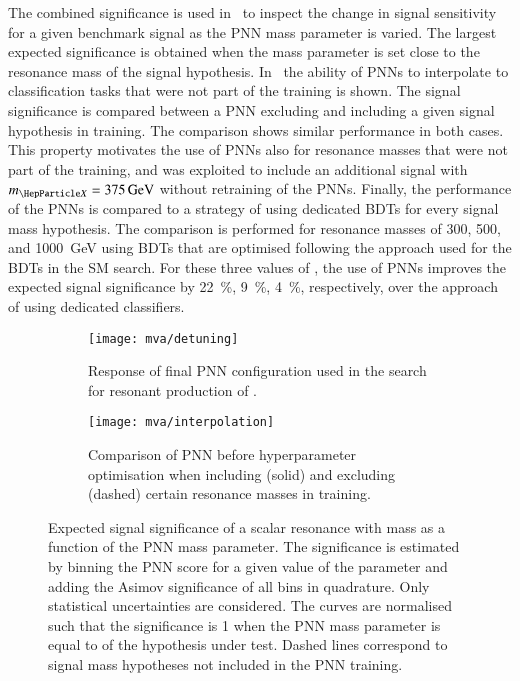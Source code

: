The combined significance is used in~ to
inspect the change in signal sensitivity for a given benchmark signal
as the PNN mass parameter is varied. The largest expected significance
is obtained when the mass parameter is set close to the resonance mass
of the signal hypothesis.
In~ the ability of PNNs to interpolate to
classification tasks that were not part of the training is shown. The
signal significance is compared between a PNN excluding and including
a given signal hypothesis in training. The comparison shows similar
performance in both cases. This property motivates the use of PNNs
also for resonance masses that were not part of the training, and was
exploited to include an additional signal with $\mX = \SI{375}{\GeV}$
without retraining of the PNNs. %
Finally, the performance of the PNNs is compared to a strategy of
using dedicated BDTs for every signal mass hypothesis. The comparison
is performed for resonance masses of \num{300}, \num{500}, and
\SI{1000}{\GeV} using BDTs that are optimised following the approach
used for the BDTs in the SM \HH search. For these three values of \mX,
the use of PNNs improves the expected signal significance by
\SI{22}{\percent}, \SI{9}{\percent}, \SI{4}{\percent}, respectively,
over the approach of using dedicated classifiers.

\begin{figure}[htbp]
  \centering

  \begin{subfigure}[t]{.49\textwidth}
    \texttt{[image: mva/detuning]}
    \caption{Response of final PNN configuration used in the search
      for resonant production of \HH.}
    \label{fig:pnn_detuning}
  \end{subfigure}\hfill%
  \begin{subfigure}[t]{.49\textwidth}
    \centering
    \texttt{[image: mva/interpolation]}
    \caption{Comparison of PNN before hyperparameter optimisation when
      including (solid) and excluding (dashed) certain resonance
      masses in training.}
    \label{fig:pnn_interpolation}
  \end{subfigure}

  \caption[Expected signal significance as a function of the PNN mass
  parameter.]{Expected signal significance of a scalar resonance with mass \mX
    as a function of the PNN mass parameter. The significance is estimated by
    binning the PNN score for a given value of the parameter and adding the
    Asimov significance of all bins in quadrature. Only statistical
    uncertainties are considered. The curves are normalised such that the
    significance is 1 when the PNN mass parameter is equal to \mX of the
    hypothesis under test. Dashed lines correspond to signal mass hypotheses not
    included in the PNN training.}
  \label{fig:pnn_properties}
\end{figure}

